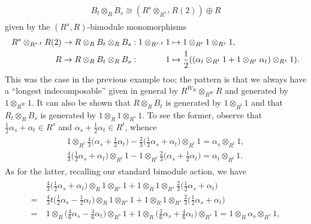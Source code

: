 \begin{example}
\begin{align*}
\begin{split}
B_t \otimes_R B_s \cong (R^s \otimes_{R^{s,t}} R(2)) \oplus R
\end{split}
\end{align*}
\noindent given by the $(R^s, R)$-bimodule monomorphisms
\begin{align*}
\begin{split}
R^s \otimes_{R^{s,t}} R(2) &\to R \otimes_R B_t \otimes_R B_s : 1 \otimes_{R^{s,t}} 1 \mapsto 1 \otimes_{R^t} 1 \otimes_{R^s} 1,\\
R &\to R \otimes_R B_t \otimes_R B_s : \hphantom{1 \otimes_{R^{s,t}} 1}\nhphantom{$1$} 1 \mapsto \frac{1}{2}((\alpha_t \otimes_{R^t} 1 + 1 \otimes_{R^t} \alpha_t) \otimes_{R^s} 1).
\end{split}
\end{align*}
\newpage
\noindent This was the case in the previous example too; the pattern is that we always have a ``longest indecomposable'' given in general by $R^{W_K} \otimes_{R^W} R$ and generated by $1 \otimes_{R^W} 1$. It can also be shown that $R \otimes_R B_t$ is generated by $1 \otimes_{R^t} 1$ and that $R_t \otimes_R B_s$ is generated by $1 \otimes_R 1 \otimes_{R^s} 1$. To see the former, observe that $\frac{1}{2}\alpha_s + \alpha_t \in R^s$ and $\alpha_s + \frac{1}{2}\alpha_t \in R^t$, whence
\begin{align*}
\begin{split}
1 \otimes_{R^t} \frac{4}{3}\Big(\alpha_s + \frac{1}{2}\alpha_t\Big) - \frac{2}{3}\Big(\frac{1}{2}\alpha_s + \alpha_t\Big) \otimes_{R^t} 1 = \alpha_s \otimes_{R^t} 1,\\
\frac{4}{3}\Big(\frac{1}{2}\alpha_s + \alpha_t\Big) \otimes_{R^t} 1 - 1 \otimes_{R^t} \frac{2}{3}\Big(\alpha_s + \frac{1}{2}\alpha_t\Big) = \alpha_t \otimes_{R^t} 1.
\end{split}
\end{align*}
\noindent As for the latter, recalling our standard bimodule action, we have
\begin{align*}
\begin{split}
&\ \frac{4}{3}\Big(\frac{1}{2}\alpha_s + \alpha_t\Big) \otimes_R 1 \otimes_{R^s} 1 + 1 \otimes_R 1 \otimes_{R^s} \frac{2}{3}\Big(\frac{1}{2}\alpha_s + \alpha_t\Big)\\
=&\ \frac{4}{3}t\Big(\frac{1}{2}\alpha_s - \frac{1}{2}\alpha_t\Big) \otimes_R 1 \otimes_{R^s} 1 + 1 \otimes_R 1 \otimes_{R^s} \frac{2}{3}\Big(\frac{1}{2}\alpha_s + \alpha_t\Big)\\
=&\ 1 \otimes_R \Big(\frac{4}{6}\alpha_s - \frac{4}{6}\alpha_t\Big) \otimes_{R^s} 1 + 1 \otimes_R \Big(\frac{2}{6}\alpha_s + \frac{4}{6}\alpha_t\Big) \otimes_{R^s} 1 = 1 \otimes_R \alpha_s \otimes_{R^s} 1,

\end{split}
\end{align*}
\end{example}
